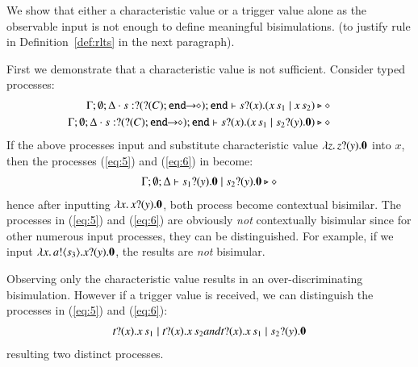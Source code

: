 \begin{example}
\label{ex:motivation}
We show that either a characteristic value or 
a trigger value alone as the observable input 
is not enough to define meaningful bisimulations.
(to justify rule  in Definition~\ref{def:rlts} in the next paragraph). 

First we demonstrate that a characteristic value is not sufficient. 
	Consider typed processes:
	\begin{eqnarray}
&&\hspace{-1cm}\Gamma; \es; \Delta \cat s: \btinp{\shot{\btinp{C} \tinact}} \tinact \proves \binp{s}{x} (\appl{x}{s_1} \Par \appl{x}{s_2}) \hastype \Proc
\label{eq:5}
\\
&&\hspace{-1cm}\Gamma; \es; \Delta \cat s: \btinp{\shot{\btinp{C} \tinact}} \tinact \proves \binp{s}{x} (\appl{x}{s_1} \Par \binp{s_2}{y} \inact)
\hastype \Proc
\label{eq:6}
	\end{eqnarray}
	If the above processes input and substitute  
	characteristic value $\lambda z.\,z ? (y) . \mathbf{0}$ into $x$, 
then the processes (\ref{eq:5}) and (\ref{eq:6}) in become:
	\begin{eqnarray*}
		\Gamma; \emptyset; \Delta \vdash s_1 ? (y) . \mathbf{0} \;|\; s_2 ? (y) . \mathbf{0} \triangleright \diamond
	\end{eqnarray*}
hence after inputting $\lambda x.\,x ? (y) . \mathbf{0}$, 
both process become contextual bisimilar. 
The processes in (\ref{eq:5}) and (\ref{eq:6}) 
are obviously {\em not} contextually bisimular since
for other numerous input processes, they can be distinguished. 
For example, if we input $\lambda x.\,a ! \langle s_3 \rangle . x ? (y) . \mathbf{0}$, 
the results are {\em not} bisimular. 

Observing only the characteristic value 
results in an over-discriminating bisimulation.
However if a trigger value is received, 
we can distinguish 
the processes in (\ref{eq:5}) and (\ref{eq:6}):  
%
\begin{eqnarray*}
t ? (x) . x\, {s_1} \;|\; t ? (x) . x\, {s_2} 
\relax{ and }
t ? (x) . x\, {s_1} \;|\; s_2 ? (y) . \mathbf{0} 
\end{eqnarray*}
\noi resulting two distinct processes.  


\end{example}
